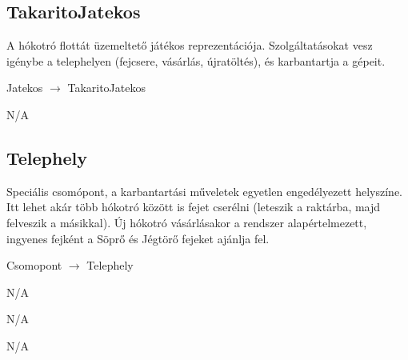\subsection{TakaritoJatekos}
\begin{class-template-responsibility}
   A hókotró flottát üzemeltető játékos reprezentációja. Szolgáltatásokat vesz igénybe a telephelyen (fejcsere, vásárlás, újratöltés), és karbantartja a gépeit.
\end{class-template-responsibility}
\begin{class-template-baseclass}
    Jatekos $\rightarrow$ TakaritoJatekos
\end{class-template-baseclass}
\begin{class-template-interface}
    N/A
\end{class-template-interface}
\begin{class-template-attribute}
\end{class-template-attribute}
\begin{class-template-method}
\end{class-template-method}

\subsection{Telephely}
\begin{class-template-responsibility}
   Speciális csomópont, a karbantartási műveletek egyetlen engedélyezett helyszíne. Itt lehet akár több hókotró között is fejet cserélni (leteszik a raktárba, majd felveszik a másikkal). Új hókotró vásárlásakor a rendszer alapértelmezett, ingyenes fejként a Söprő és Jégtörő fejeket ajánlja fel.
\end{class-template-responsibility}
\begin{class-template-baseclass}
    Csomopont $\rightarrow$ Telephely
\end{class-template-baseclass}
\begin{class-template-interface}
    N/A
\end{class-template-interface}
\begin{class-template-attribute}
    N/A
\end{class-template-attribute}
\begin{class-template-method}
    N/A
\end{class-template-method}

